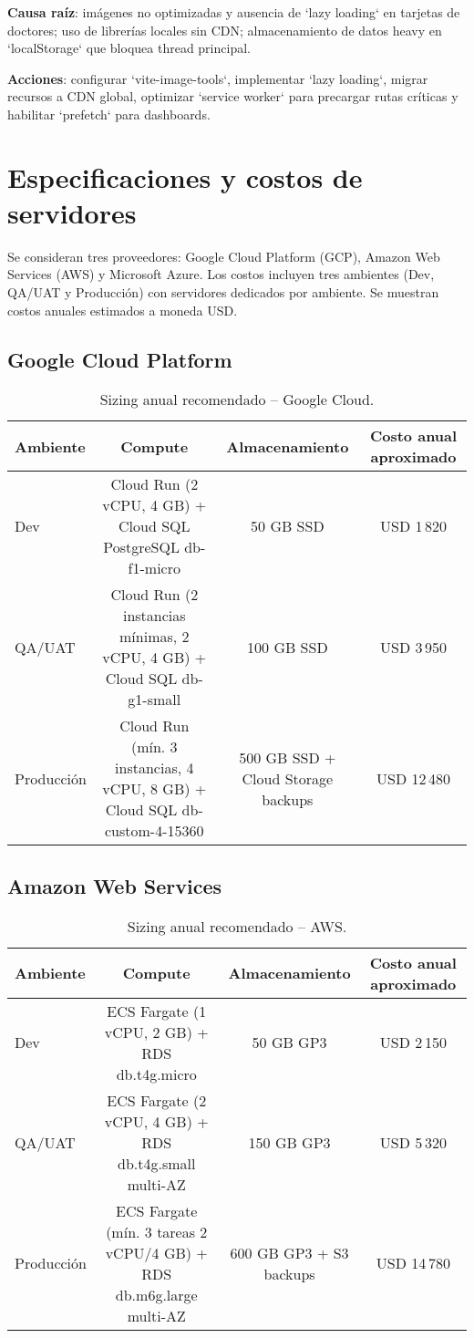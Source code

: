 \documentclass[12pt,letterpaper]{article}
\begin{document}
\textbf{Causa raíz}: imágenes no optimizadas y ausencia de `lazy loading` en tarjetas de doctores; uso de librerías locales sin CDN; almacenamiento de datos heavy en `localStorage` que bloquea thread principal.

\textbf{Acciones}: configurar `vite-image-tools`, implementar `lazy loading`, migrar recursos a CDN global, optimizar `service worker` para precargar rutas críticas y habilitar `prefetch` para dashboards.

\section{Especificaciones y costos de servidores}
Se consideran tres proveedores: Google Cloud Platform (GCP), Amazon Web Services (AWS) y Microsoft Azure. Los costos incluyen tres ambientes (Dev, QA/UAT y Producción) con servidores dedicados por ambiente. Se muestran costos anuales estimados a moneda USD.

\subsection{Google Cloud Platform}
\begin{table}[H]
  \centering
  \caption{Sizing anual recomendado -- Google Cloud.}
  \begin{tabular}{lccc}
    \toprule
    Ambiente & Compute & Almacenamiento & Costo anual aproximado \\
    \midrule
    Dev & Cloud Run (2 vCPU, 4 GB) + Cloud SQL PostgreSQL db-f1-micro & 50 GB SSD & USD 1\,820 \\
    QA/UAT & Cloud Run (2 instancias mínimas, 2 vCPU, 4 GB) + Cloud SQL db-g1-small & 100 GB SSD & USD 3\,950 \\
    Producción & Cloud Run (mín. 3 instancias, 4 vCPU, 8 GB) + Cloud SQL db-custom-4-15360 & 500 GB SSD + Cloud Storage backups & USD 12\,480 \\
    \bottomrule
  \end{tabular}
\end{table}

\subsection{Amazon Web Services}
\begin{table}[H]
  \centering
  \caption{Sizing anual recomendado -- AWS.}
  \begin{tabular}{lccc}
    \toprule
    Ambiente & Compute & Almacenamiento & Costo anual aproximado \\
    \midrule
    Dev & ECS Fargate (1 vCPU, 2 GB) + RDS db.t4g.micro & 50 GB GP3 & USD 2\,150 \\
    QA/UAT & ECS Fargate (2 vCPU, 4 GB) + RDS db.t4g.small multi-AZ & 150 GB GP3 & USD 5\,320 \\
    Producción & ECS Fargate (mín. 3 tareas 2 vCPU/4 GB) + RDS db.m6g.large multi-AZ & 600 GB GP3 + S3 backups & USD 14\,780 \\
    \bottomrule
  \end{tabular}
\end{table}
\end{document}
